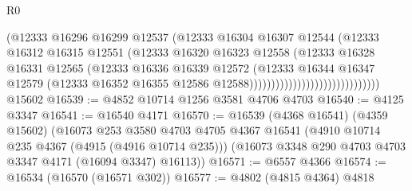 \begin{lexlean}{R0}
\begin{coremodule}
                                                (@12333
                                                  @16296
                                                  @16299
                                                  @12537
                                                  (@12333
                                                    @16304
                                                    @16307
                                                    @12544
                                                    (@12333
                                                      @16312
                                                      @16315
                                                      @12551
                                                      (@12333
                                                        @16320
                                                        @16323
                                                        @12558
                                                        (@12333
                                                          @16328
                                                          @16331
                                                          @12565
                                                          (@12333
                                                            @16336
                                                            @16339
                                                            @12572
                                                            (@12333
                                                              @16344
                                                              @16347
                                                              @12579
                                                              (@12333
                                                                @16352
                                                                @16355
                                                                @12586
                                                                @12588))))))))))))))))))))))))))))))
    @15602
@16539 := @4852 @10714 @1256 @3581 @4706 @4703
@16540 := @4125 @3347
@16541 := @16540 @4171
@16570 := @16539
    (@4368 @16541)
    (@4359 @15602)
    (@16073
      @253
      @3580
      @4703
      @4705
      @4367
      @16541
      (@4910 @10714 @235 @4367 (@4915 (@4916 @10714 @235)))
      (@16073 @3348 @290 @4703 @4703 @3347 @4171 (@16094 @3347) @16113))
@16571 := @6557 @4366
@16574 := @16534 (@16570 (@16571 @302))
@16577 := @4802 (@4815 @4364) @4818

\end{coremodule}
\end{lexlean}
